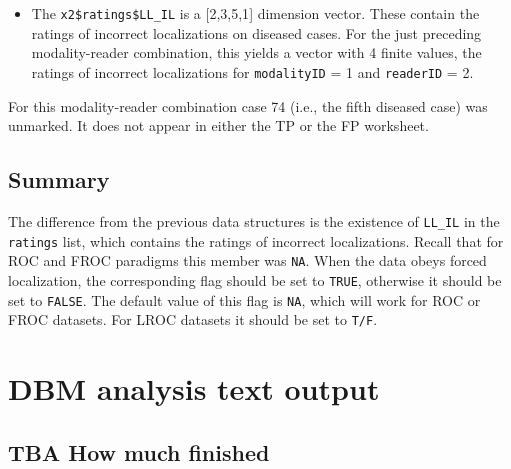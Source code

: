 \documentclass[
]{book}
\newenvironment{Shaded}{\begin{snugshade}}{\end{snugshade}}
\newcommand{\CommentTok}[1]{\textcolor[rgb]{0.56,0.35,0.01}{\textit{#1}}}
\newcommand{\DecValTok}[1]{\textcolor[rgb]{0.00,0.00,0.81}{#1}}
\newcommand{\NormalTok}[1]{#1}
\newcommand{\OperatorTok}[1]{\textcolor[rgb]{0.81,0.36,0.00}{\textbf{#1}}}
\providecommand{\tightlist}{%
  \setlength{\itemsep}{0pt}\setlength{\parskip}{0pt}}
\begin{document}
\begin{itemize}
\tightlist
\item
  The \texttt{x2\$ratings\$LL\_IL} is a {[}2,3,5,1{]} dimension vector. These contain the ratings of incorrect localizations on diseased cases. For the just preceding modality-reader combination, this yields a vector with 4 finite values, the ratings of incorrect localizations for \texttt{modalityID} = 1 and \texttt{readerID} = 2.
\end{itemize}

\begin{Shaded}
\end{Shaded}

For this modality-reader combination case 74 (i.e., the fifth diseased case) was unmarked. It does not appear in either the TP or the FP worksheet.

\hypertarget{quick-start-lroc-data-summary}{%
\section{Summary}\label{quick-start-lroc-data-summary}}

The difference from the previous data structures is the existence of \texttt{LL\_IL} in the \texttt{ratings} list, which contains the ratings of incorrect localizations. Recall that for ROC and FROC paradigms this member was \texttt{NA}. When the data obeys forced localization, the corresponding flag should be set to \texttt{TRUE}, otherwise it should be set to \texttt{FALSE}. The default value of this flag is \texttt{NA}, which will work for ROC or FROC datasets. For LROC datasets it should be set to \texttt{T/F}.

\hypertarget{quick-start-dbm-text}{%
\chapter{DBM analysis text output}\label{quick-start-dbm-text}}

\hypertarget{quick-start-dbm-text-how-much-finished}{%
\section{TBA How much finished}\label{quick-start-dbm-text-how-much-finished}}
\end{document}
